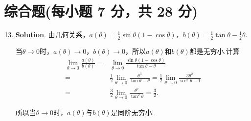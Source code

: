 \documentclass[../Main.tex]{subfiles}
\begin{document}
\section{综合题(每小题 7 分，共 28 分)}
\begin{enumerate}
    \setcounter{enumi}{12}
    \item \textbf{Solution}. 由几何关系，$a(\theta)=\frac{1}{2}\sin\theta(1-
              \cos\theta)$，$b(\theta)=\frac{1}{2}\tan\theta-\frac{1}{2}\theta$.

          当$\theta\to0$时，$a(\theta)\to0$，$b(\theta)\to0$，所以$a(\theta)$和$b(\theta
              )$都是无穷小.计算
          \[
              \begin{aligned}
                  \lim_{\theta\to0}\frac{a(\theta)}{b(\theta)}= & \lim_{\theta\to0}\frac{\sin\theta(1-\cos\theta)}{\tan\theta-\theta}                                                         \\
                  =                                             & \frac{1}{2}\lim_{\theta\to0}\frac{\theta^3}{\tan\theta-\theta}=\frac{1}{2}\lim_{\theta\to0}\frac{3\theta^2}{\sec^2\theta-1} \\
                  =                                             & \frac{3}{2}\lim_{\theta\to0}\frac{\theta^2}{\tan^2\theta}=\frac{3}{2}.
              \end{aligned}
          \]

          所以当$\theta\to0$时，$a(\theta)$与$b(\theta)$是同阶无穷小.


\end{enumerate}
\end{document}
